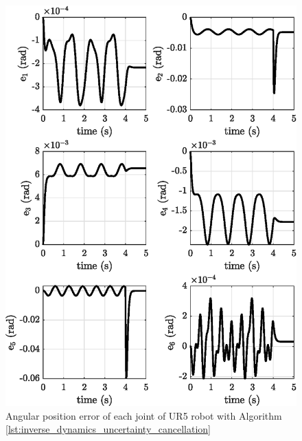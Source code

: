 \begin{figure}[H]
    \centering
    \includegraphics{images/act_2.5/e.eps}
    \caption{Angular position error of each joint of UR5 robot with Algorithm \ref{lst:inverse_dynamics_uncertainty_cancellation}}
    \label{fig:act_2.5_e}
\end{figure}
